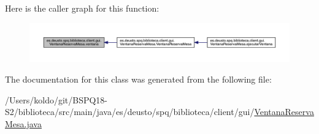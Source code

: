 Here is the caller graph for this function\+:
\nopagebreak
\begin{figure}[H]
\begin{center}
\leavevmode
\includegraphics[width=350pt]{classes_1_1deusto_1_1spq_1_1biblioteca_1_1client_1_1gui_1_1_ventana_reserva_mesa_a4b8df9a84d5e9378de27ca0e1aaaa690_icgraph}
\end{center}
\end{figure}


The documentation for this class was generated from the following file\+:\begin{DoxyCompactItemize}
\item 
/\+Users/koldo/git/\+B\+S\+P\+Q18-\/\+S2/biblioteca/src/main/java/es/deusto/spq/biblioteca/client/gui/\mbox{\hyperlink{_ventana_reserva_mesa_8java}{Ventana\+Reserva\+Mesa.\+java}}\end{DoxyCompactItemize}
